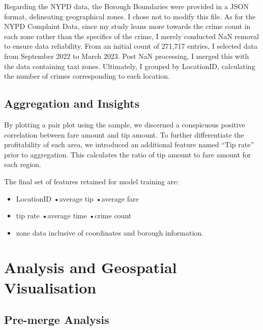 \documentclass[11pt]{article}
\begin{document}
Regarding the NYPD data, the Borough Boundaries were provided in a JSON format, delineating geographical zones. I chose not to modify this file. As for the NYPD Complaint Data, since my study leans more towards the crime count in each zone rather than the specifics of the crime, I merely conducted NaN removal to ensure data reliability. From an initial count of 271,717 entries, I selected data from September 2022 to March 2023. Post NaN processing, I merged this with the data containing taxi zones. Ultimately, I grouped by LocationID, calculating the number of crimes corresponding to each location.

\subsection{Aggregation and Insights}

By plotting a pair plot using the sample, we discerned a conspicuous positive correlation between fare amount and tip amount. To further differentiate the profitability of each area, we introduced an additional feature named “Tip rate” prior to aggregation. This calculates the ratio of tip amount to fare amount for each region.

The final set of features retained for model training are: 
\begin{itemize} 
    \item LocationID \quad\quad\quad •average tip  \quad\quad\quad•average fare
    \item tip rate \quad\quad\quad\quad •average time \quad\quad\quad •crime count
    \item zone data inclusive of coordinates and borough information.
\end{itemize}



\section{Analysis and Geospatial Visualisation}
\subsection{Pre-merge Analysis}
\end{document}
